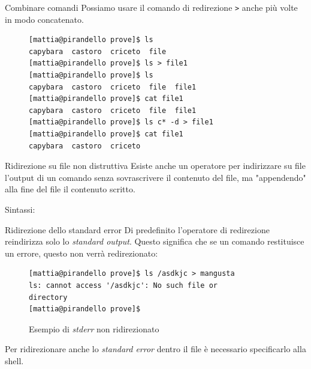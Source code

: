 \begin{frame}[fragile]{Combinare comandi}
  Possiamo usare il comando di redirezione \texttt{>} anche più volte in modo
  concatenato.

  \begin{figure}
    \begin{lstlisting}
[mattia@pirandello prove]$ ls 
capybara  castoro  criceto  file 
[mattia@pirandello prove]$ ls > file1
[mattia@pirandello prove]$ ls 
capybara  castoro  criceto  file  file1
[mattia@pirandello prove]$ cat file1 
capybara  castoro  criceto  file  file1 
[mattia@pirandello prove]$ ls c* -d > file1
[mattia@pirandello prove]$ cat file1 
capybara  castoro  criceto 
\end{lstlisting}
  \end{figure}
\end{frame}

\begin{frame}{Ridirezione su file non distruttiva}
  Esiste anche un operatore per indirizzare su file l'output di un comando senza 
  sovrascrivere il contenuto del file, ma "appendendo" alla fine del file il
  contenuto scritto.\bigskip

  Sintassi: \bigskip
\end{frame}

\begin{frame}[fragile]{Ridirezione dello standard error}
  Di predefinito l'operatore di redirezione reindirizza solo lo \textit{standard output}.
  Questo significa che se un comando restituisce un errore, questo non verrà 
  redirezionato:\medskip

  \begin{figure}
    \begin{lstlisting}
[mattia@pirandello prove]$ ls /asdkjc > mangusta
ls: cannot access '/asdkjc': No such file or 
directory
[mattia@pirandello prove]$
\end{lstlisting}
    \caption{Esempio di \textit{stderr} non ridirezionato}
  \end{figure}

  Per ridirezionare anche lo \textit{standard error} dentro il file è necessario
  specificarlo alla shell.
\end{frame}

